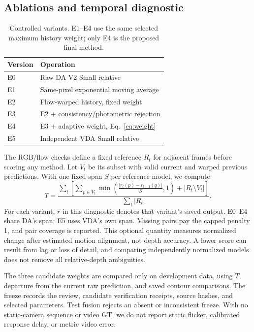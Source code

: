 \subsection{Ablations and temporal diagnostic}
\begin{table}[t]
\centering\small
\begin{tabular}{ll}
\toprule
Version & Operation\\\midrule
E0 & Raw DA V2 Small relative\\
E1 & Same-pixel exponential moving average\\
E2 & Flow-warped history, fixed weight\\
E3 & E2 + consistency/photometric rejection\\
E4 & E3 + adaptive weight, Eq.~\ref{eq:weight}\\
E5 & Independent VDA Small relative\\\bottomrule
\end{tabular}
\caption{Controlled variants. E1--E4 use the same selected maximum history weight; only E4 is the proposed final method.}
\label{tab:ablations}
\end{table}
The RGB/flow checks define a fixed reference $R_t$ for adjacent frames before scoring any method. Let $V_t$ be its subset with valid current and warped previous predictions. With one fixed span $S$ per reference model, we compute
\begin{equation}
T=\frac{\sum_t\left[\sum_{p\in V_t}\min\left(\frac{|r_t(p)-r_{t-1}(q)|}{S},1\right)+|R_t\setminus V_t|\right]}{\sum_t|R_t|}.
\label{eq:temporal}
\end{equation}
For each variant, $r$ in this diagnostic denotes that variant's saved output. E0--E4 share DA's span; E5 uses VDA's own span. Missing pairs pay the capped penalty 1, and pair coverage is reported. This optional quantity measures normalized change after estimated motion alignment, not depth accuracy. A lower score can result from lag or loss of detail, and comparing independently normalized models does not remove all relative-depth ambiguities.

The three candidate weights are compared only on development data, using $T$, departure from the current raw prediction, and saved contour comparisons. The freeze records the review, candidate verification receipts, source hashes, and selected parameters. Test fusion rejects an absent or inconsistent freeze. With no static-camera sequence or video GT, we do not report static flicker, calibrated response delay, or metric video error.

